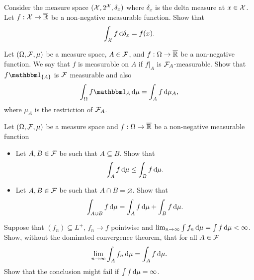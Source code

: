 \begin{problem} Consider the measure space $(\mathcal X, 2^{\mathcal X},\delta_x)$ where $\delta_x$ is the delta measure at $x\in \mathcal X$. Let $f:\mathcal X\to \overline{\mathbb R}$ be a non-negative measurable function. Show that 
\begin{equation*}
    \int_{\mathcal X} f \,\mathrm{d} \delta_x = f(x).
\end{equation*}  
\end{problem}

\begin{problem} Let $(\Omega,\mathcal F,\mu)$ be a measure space, $A\in \mathcal F$, and $f:\Omega\to \overline{\mathbb R}$ be a non-negative  function. We say that $f$ is measurable on $A$ if $f|_{A}$ is $\mathcal F_A$-measurable. Show that $f \ind{A}$ is $\mathcal F$ measurable and also 
\begin{equation*}
    \int_\Omega f  \indE{A} \,\De \mu = \int_A f \,\De \mu_A, 
\end{equation*}
where $\mu_A$ is the restriction of $\mathcal F_A$.
\end{problem}

\begin{problem}
    Let $(\Omega,\mathcal F,\mu)$ be a measure space and $f:\Omega\to \overline{\mathbb R}$ be a non-negative measurable function
    \begin{itemize}
        \item Let $A,B\in \mathcal F$ be such that $A\subseteq B$. Show that
        \begin{equation*}
            \int_{A} f\,\mathrm{d} \mu \leq  \int_{B} f\,\mathrm{d} \mu.
        \end{equation*}
        \item Let $A,B\in \mathcal F$ be such that $A\cap B = \varnothing$. Show that 
        \begin{equation*}
            \int_{A\cup B} f\,\mathrm{d} \mu =  \int_{A} f\,\mathrm{d} \mu + \int_{B} f\,\mathrm{d} \mu.
        \end{equation*}
    \end{itemize}
\end{problem}

\begin{problem}
     Suppose that $(f_n)\subseteq L^+$, $f_n\to f$ pointwise and $\lim_{n\to\infty} \int f_n\, \mathrm{d}\mu =  \int f\, \mathrm{d}\mu <\infty$. Show, without the dominated convergence theorem, that 
     for all $A\in \mathcal F$
     \begin{equation*}
         \lim_{n\to\infty} \int_A f_n\,\mathrm{d} \mu = \int_A f\,\mathrm{d} \mu.
     \end{equation*}  
     Show that the conclusion might fail if $ \int f\, \mathrm{d}\mu = \infty$.
\end{problem}

